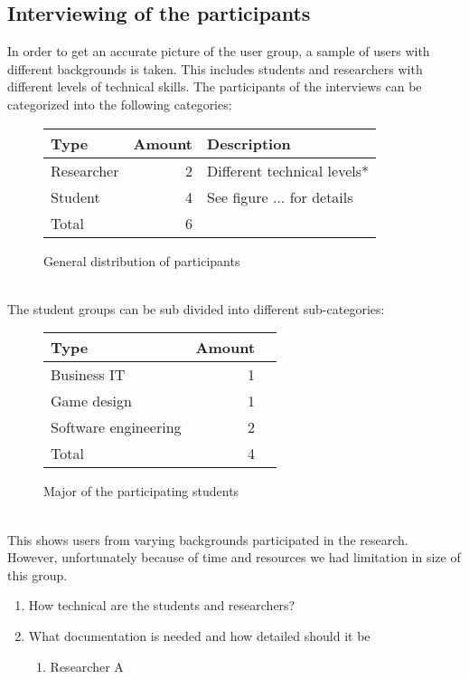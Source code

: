 \documentclass[conference]{IEEEtran}
\begin{document}
\begin{figure*}[ht]
\begin{enumerate}
\begin{enumerate}
\begin{figure*}[!ht]
	\subsection{Interviewing of the participants}
		In order to get an accurate picture of the user group, a sample of users with different backgrounds is taken. This includes students and researchers with different levels of technical skills. The participants of the interviews can be categorized into the following categories:
		\begin{figure}[ht]
			\centering
			\begin{tabular}{ | l | r | l | }
				\hline
				Type			& Amount	& Description \\ \hline \hline
				Researcher		& 2			& Different technical levels* \\ \hline
				Student			& 4			& See figure ... for details \\ \hline \hline
				Total			& 6			& \\ \hline
			\end{tabular}
			\caption{General distribution of participants}
		\end{figure}\\
		The student groups can be sub divided into different sub-categories:
		\begin{figure}[ht]
			\centering
			\begin{tabular}{ | l | r | l | }
				\hline
				Type					& Amount \\ \hline \hline
				Business IT				& 1 \\ \hline
				Game design				& 1 \\ \hline
				Software engineering	& 2 \\ \hline
				Total					& 4 \\ \hline
			\end{tabular}
			\caption{Major of the participating students}
		\end{figure} \\
		This shows users from varying backgrounds participated in the research. However, unfortunately because of time and resources we had limitation in size of this group.
		\begin{enumerate}
			\item How technical are the students and researchers?
				\item What documentation is needed and how detailed should it be
				
				\begin{enumerate}
					\item Researcher A\\


\end{enumerate}
\end{enumerate}
\end{figure*}
\end{enumerate}
\end{enumerate}
\end{figure*}
\end{document}
